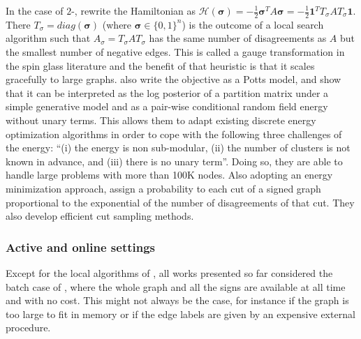 In the case of $2$-\pcc{}, \textcite{Facchetti2011isingmodel} rewrite the Hamiltonian as
$\mathcal{H}(\bm{\sigma}) = -\frac{1}{2}\bm{\sigma}^T A \bm{\sigma} = -\frac{1}{2}\bm{1}^TT_\sigma A
T_\sigma\bm{1}$. There $T_\sigma = diag(\bm{\sigma})$ (where $\bm{\sigma} \in \{0,1\}^n$) is the
outcome of a local search algorithm such that $A_\sigma = T_\sigma A T_\sigma$ has the same number
of disagreements as $A$ but the smallest number of negative edges. This is called a gauge
transformation in the spin glass literature and the benefit of that heuristic is that it scales
gracefully to large graphs.
\Textcite{Bagon2011} also write the \maxa{} objective as a Potts model, and show that it can be
interpreted as the log posterior of a partition matrix under a simple generative model and as a
pair-wise conditional random field energy without unary terms. This allows them to adapt existing
discrete energy optimization algorithms in order to cope with the following three challenges of the
\pcc{} energy: \enquote{(i) the energy is non sub-modular, (ii) the number of clusters is not known
in advance, and (iii) there is no unary term}. Doing so, they are able to handle large problems with
more than 100K nodes.  Also adopting an energy minimization approach, \textcite{Kappes2016} assign a
probability to each cut of a signed graph proportional to the exponential of the number of
disagreements of that cut. They also develop efficient cut sampling methods.



\subsubsection{Active and online settings}

Except for the local algorithms of \textcite{Bonchi2013}, all works presented so far considered the
batch case of \pcc{}, where the whole graph and all the signs are available at all time and with no
cost. This might not always be the case, for instance if the graph is too large to fit in memory or
if the edge labels are given by an expensive external procedure.

